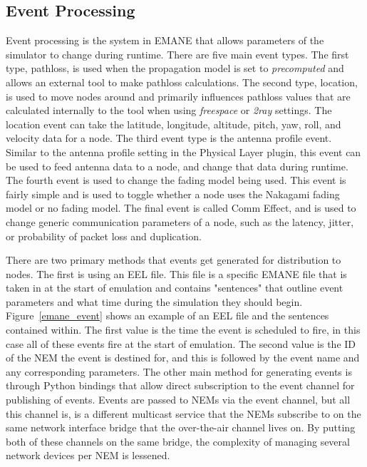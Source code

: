 \subsection{Event Processing}
Event processing is the system in EMANE that allows parameters of the simulator to change during runtime.
There are five main event types.
The first type, pathloss, is used when the propagation model is set to \textit{precomputed} and allows an external tool to make pathloss calculations.
The second type, location, is used to move nodes around and primarily influences pathloss values that are calculated internally to the tool when using \textit{freespace} or \textit{2ray} settings.
The location event can take the latitude, longitude, altitude, pitch, yaw, roll, and velocity data for a node.
The third event type is the antenna profile event.
Similar to the antenna profile setting in the Physical Layer plugin, this event can be used to feed antenna data to a node, and change that data during runtime.
The fourth event is used to change the fading model being used.
This event is fairly simple and is used to toggle whether a node uses the Nakagami fading model or no fading model.
The final event is called Comm Effect, and is used to change generic communication parameters of a node, such as the latency, jitter, or probability of packet loss and duplication.\par
There are two primary methods that events get generated for distribution to nodes.
The first is using an EEL file.
This file is a specific EMANE file that is taken in at the start of emulation and contains "sentences" that outline event parameters and what time during the simulation they should begin.
Figure~\ref{emane_event} shows an example of an EEL file and the sentences contained within.
The first value is the time the event is scheduled to fire, in this case all of these events fire at the start of emulation.
The second value is the ID of the NEM the event is destined for, and this is followed by the event name and any corresponding parameters.
The other main method for generating events is through Python bindings that allow direct subscription to the event channel for publishing of events.
Events are passed to NEMs via the event channel, but all this channel is, is a different multicast service that the NEMs subscribe to on the same network interface bridge that the over-the-air channel lives on.
By putting both of these channels on the same bridge, the complexity of managing several network devices per NEM is lessened.

